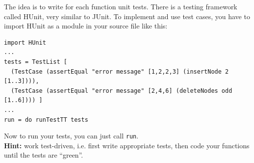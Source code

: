 \documentclass [11pt, a4wide, twoside]{article}
\begin{document}
\noindent The idea is to write for each function unit tests. There is a testing framework called HUnit, very similar to JUnit. To implement and use test cases,  you have to import HUnit as a module in your source file like 
this:

\fontsize{8pt}{10pt}
\begin{verbatim}
import HUnit
...
tests = TestList [
  (TestCase (assertEqual "error message" [1,2,2,3] (insertNode 2 [1..3]))),
  (TestCase (assertEqual "error message" [2,4,6] (deleteNodes odd [1..6]))) ]
...
run = do runTestTT tests
\end{verbatim}
\fontsize{10pt}{12pt}

\noindent Now to run your tests, you can just call \texttt{run}.\\

\noindent \textbf{Hint:} work test-driven, i.e. first write appropriate tests, then code your functions until the tests are 
``green''.\\

\solution{}



%
%
%
%	
%
%
%
\end{document}
